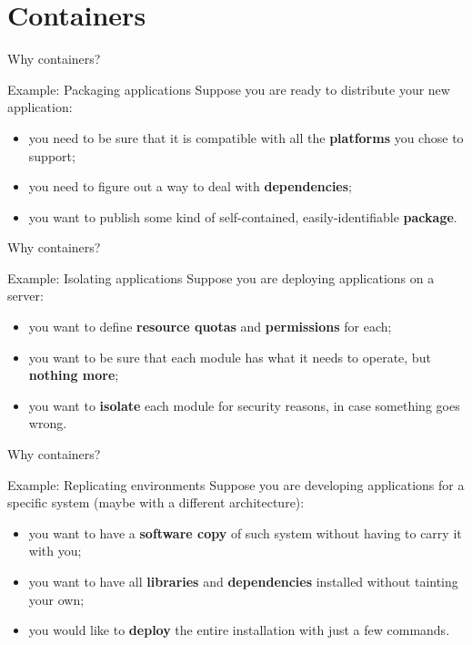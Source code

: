 
\section{Containers}
\graphicspath{{figs/section4/}}

\begin{frame}{Why containers?}
	\begin{exampleblock}{Example: Packaging applications}
		Suppose you are ready to distribute your new application:
		\begin{itemize}
			\item you need to be sure that it is compatible with all the \textbf{platforms} you chose to support;
			\item you need to figure out a way to deal with \textbf{dependencies};
			\item you want to publish some kind of self-contained, easily-identifiable \textbf{package}.
		\end{itemize}
	\end{exampleblock}
\end{frame}
\begin{frame}{Why containers?}
	\begin{exampleblock}{Example: Isolating applications}
		Suppose you are deploying applications on a server:
		\begin{itemize}
			\item you want to define \textbf{resource quotas} and \textbf{permissions} for each;
			\item you want to be sure that each module has what it needs to operate, but \textbf{nothing more};
			\item you want to \textbf{isolate} each module for security reasons, in case something goes wrong.
		\end{itemize}
	\end{exampleblock}
\end{frame}
\begin{frame}{Why containers?}
	\begin{exampleblock}{Example: Replicating environments}
		Suppose you are developing applications for a specific system (maybe with a different architecture):
		\begin{itemize}
			\item you want to have a \textbf{software copy} of such system without having to carry it with you;
			\item you want to have all \textbf{libraries} and \textbf{dependencies} installed without tainting your own;
			\item you would like to \textbf{deploy} the entire installation with just a few commands.
		\end{itemize}
	\end{exampleblock}
\end{frame}
